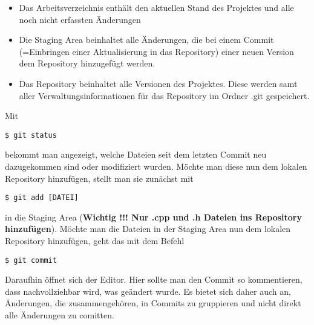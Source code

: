\documentclass[a4paper,11pt,german]{article}
\begin{document}
\begin{itemize}
\item Das
Arbeitsverzeichnis
enthält den aktuellen Stand des Projektes und alle noch nicht erfassten Änderungen
\item Die Staging Area
beinhaltet alle Änderungen, die bei einem Commit (=Einbringen einer Aktualisierung in das Repository) einer neuen Version dem Repository hinzugefügt werden.
\item Das
Repository
beinhaltet alle Versionen des Projektes. Diese werden samt aller Verwaltungsinformationen für das Repository im Ordner .git gespeichert.
\end{itemize}
Mit 
\begin{verbatim}
$ git status
\end{verbatim}
bekommt man angezeigt, welche Dateien seit dem letzten Commit neu dazugekommen sind oder modifiziert wurden. Möchte man diese nun dem lokalen Repository hinzufügen, stellt man sie zunächst mit
\begin{verbatim}
$ git add [DATEI]
\end{verbatim} 
in die Staging Area (\textbf{Wichtig !!! Nur .cpp und .h Dateien ins Repository hinzufügen}).
Möchte man die Dateien in der Staging Area nun dem lokalen Repository hinzufügen, geht das mit dem Befehl
\begin{verbatim}
$ git commit
\end{verbatim}
Daraufhin öffnet sich der Editor. Hier sollte man den Commit so kommentieren, dass nachvollziehbar wird, was geändert wurde. Es bietet sich daher auch an, Änderungen, die zusammengehören, in Commits zu gruppieren und nicht direkt alle Änderungen zu comitten.
\end{document}
